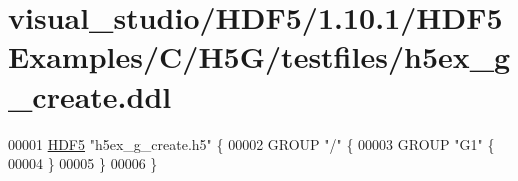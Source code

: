 \hypertarget{visual__studio_2_h_d_f5_21_810_81_2_h_d_f5_examples_2_c_2_h5_g_2testfiles_2h5ex__g__create_8ddl_source}{}\section{visual\+\_\+studio/\+H\+D\+F5/1.10.1/\+H\+D\+F5\+Examples/\+C/\+H5\+G/testfiles/h5ex\+\_\+g\+\_\+create.ddl}
\label{visual__studio_2_h_d_f5_21_810_81_2_h_d_f5_examples_2_c_2_h5_g_2testfiles_2h5ex__g__create_8ddl_source}

\begin{DoxyCode}
00001 \hyperlink{namespace_h_d_f5}{HDF5} \textcolor{stringliteral}{"h5ex\_g\_create.h5"} \{
00002 GROUP \textcolor{stringliteral}{"/"} \{
00003    GROUP \textcolor{stringliteral}{"G1"} \{
00004    \}
00005 \}
00006 \}
\end{DoxyCode}
